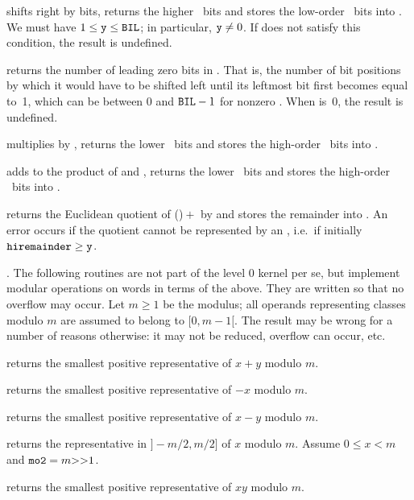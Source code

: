  shifts  right
by  bits, returns the higher \B\ bits and stores the low-order
\B\ bits into . We must have $1\le{\tt y}\le{\tt BIL}$; in
particular, ${\tt y}\neq 0$. If  does not satisfy this condition, the
result is undefined.

 returns the number of leading zero bits in .
That is, the number of bit positions by which it would have to be shifted
left until its leftmost bit first becomes equal to~1, which can be between 0
and ${\tt BIL}-1$ for nonzero . When  is~0, the result is undefined.

 multiplies  by , returns
the lower \B\ bits and stores the high-order \B\ bits into .

 adds  to the product
of  and , returns the lower \B\ bits and stores the high-order
\B\ bits into .

 returns the Euclidean quotient of
()${}+{}$ by  and stores the remainder
into . An error occurs if the quotient cannot be represented
by an , i.e.~if initially ${\tt hiremainder}\ge{\tt y}$.

.
The following routines are not part of the level 0 kernel per se, but
implement modular operations on words in terms of the above. They are written
so that no overflow may occur. Let $m \geq 1$ be the modulus; all operands
representing classes modulo $m$ are assumed to belong to $[0,m-1[$. The
result may be wrong for a number of reasons otherwise: it may not be reduced,
overflow can occur, etc.

 returns the smallest
positive representative of $x + y$ modulo $m$.

 returns the smallest
positive representative of $-x$ modulo $m$.

 returns the smallest
positive representative of $x - y$ modulo $m$.

 returns the representative
in $]-m/2,m/2]$ of $x$ modulo $m$. Assume $0 \leq x < m$ and
${\tt mo2} = m {\tt >>} 1$.

 returns the smallest positive
representative of $x y$ modulo $m$.

